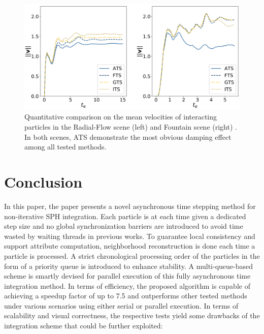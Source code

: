 \documentclass[
	11pt, 
	DIV10,
	ngerman,
	a4paper, 
	oneside, 
	headings=normal, 
	captions=tableheading,
	final, 
	numbers=noenddot
]{scrartcl}
\begin{document}
\begin{figure}[tb]
	\centering
	\includegraphics[scale=0.2]{images/10}
	\caption{\label{fig10} Quantitative comparison on the mean velocities of interacting particles in the Radial-Flow scene (left) and Fountain scene (right) \cite{reinhardt2017fully}. In both scenes, ATS demonstrate the most obvious damping effect among all tested methods.}
\end{figure}


\section{Conclusion}

In this paper, the paper presents a novel asynchronous time stepping method for non-iterative SPH integration. Each particle is at each time given a dedicated step size and no global synchronization barriers are introduced to avoid time wasted by waiting threads in previous works. To guarantee local consistency and support attribute computation, neighborhood reconstruction is done each time a particle is processed. A strict chronological processing order of the particles in the form of a priority queue is introduced to enhance stability. A multi-queue-based scheme is smartly devised for parallel execution of this fully asynchronous time integration method. In terms of efficiency, the proposed algorithm is capable of achieving a speedup factor of up to 7.5 and outperforms other tested methods under various scenarios using either serial or parallel execution. In terms of scalability and visual correctness, the respective tests yield some drawbacks of the integration scheme that could be further exploited:
\end{document}
